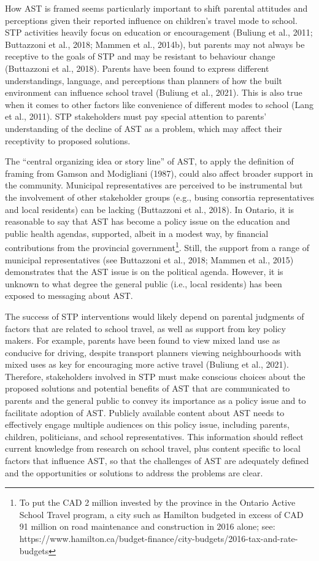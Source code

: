\documentclass[]{elsarticle} %
\begin{document}
How AST is framed seems particularly important to shift parental
attitudes and perceptions given their reported influence on children's
travel mode to school. STP activities heavily focus on education or
encouragement (Buliung et al., 2011; Buttazzoni et al., 2018; Mammen et
al., 2014b), but parents may not always be receptive to the goals of STP
and may be resistant to behaviour change (Buttazzoni et al., 2018).
Parents have been found to express different understandings, language,
and perceptions than planners of how the built environment can influence
school travel (Buliung et al., 2021). This is also true when it comes to
other factors like convenience of different modes to school (Lang et
al., 2011). STP stakeholders must pay special attention to parents'
understanding of the decline of AST as a problem, which may affect their
receptivity to proposed solutions.

The ``central organizing idea or story line'' of AST, to apply the
definition of framing from Gamson and Modigliani (1987), could also
affect broader support in the community. Municipal representatives are
perceived to be instrumental but the involvement of other stakeholder
groups (e.g., busing consortia representatives and local residents) can
be lacking (Buttazzoni et al., 2018). In Ontario, it is reasonable to
say that AST has become a policy issue on the education and public
health agendas, supported, albeit in a modest way, by financial
contributions from the provincial government\footnote{To put the CAD 2
  million invested by the province in the Ontario Active School Travel
  program, a city such as Hamilton budgeted in excess of CAD 91 million
  on road maintenance and construction in 2016 alone; see:
  https://www.hamilton.ca/budget-finance/city-budgets/2016-tax-and-rate-budgets}.
Still, the support from a range of municipal representatives (see
Buttazzoni et al., 2018; Mammen et al., 2015) demonstrates that the AST
issue is on the political agenda. However, it is unknown to what degree
the general public (i.e., local residents) has been exposed to messaging
about AST.

The success of STP interventions would likely depend on parental
judgments of factors that are related to school travel, as well as
support from key policy makers. For example, parents have been found to
view mixed land use as conducive for driving, despite transport planners
viewing neighbourhoods with mixed uses as key for encouraging more
active travel (Buliung et al., 2021). Therefore, stakeholders involved
in STP must make conscious choices about the proposed solutions and
potential benefits of AST that are communicated to parents and the
general public to convey its importance as a policy issue and to
facilitate adoption of AST. Publicly available content about AST needs
to effectively engage multiple audiences on this policy issue, including
parents, children, politicians, and school representatives. This
information should reflect current knowledge from research on school
travel, plus content specific to local factors that influence AST, so
that the challenges of AST are adequately defined and the opportunities
or solutions to address the problems are clear.
\end{document}
